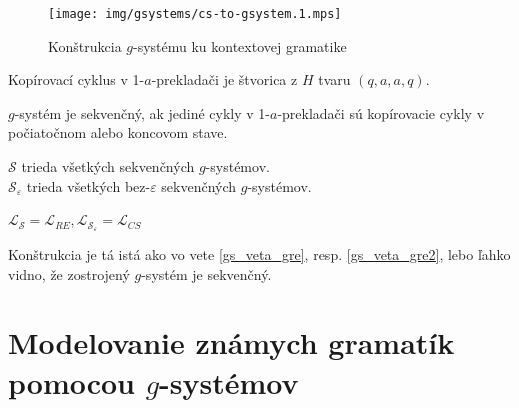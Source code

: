 \begin{figure}
    \centering
    \texttt{[image: img/gsystems/cs-to-gsystem.1.mps]}
    \caption{Konštrukcia $g$-systému ku kontextovej gramatike}
    \label{fig:cs-to-gsystem}
\end{figure}

\begin{definicia}
Kopírovací cyklus v 1-$a$-prekladači je štvorica z $H$ tvaru
$(q,a,a,q)$.
\end{definicia}

\begin{definicia}
$g$-systém je sekvenčný, ak jediné cykly v 1-$a$-prekladači sú
kopírovacie cykly v počiatočnom alebo koncovom stave.
\end{definicia}

\begin{oznacenie}
$\mathcal{S}$ trieda všetkých sekvenčných $g$-systémov.\\
$\mathcal{S}_\varepsilon$ trieda všetkých bez-$\varepsilon$
sekvenčných $g$-systémov.
\end{oznacenie}

\pagebreak

\begin{veta}\label{gs_veta_gsek}
$\mathcal{L}_{\mathcal{S}}=\mathcal{L}_{RE},
\mathcal{L}_{\mathcal{S}_\varepsilon}=\mathcal{L}_{CS}$
\end{veta}

\begin{dokaz}
Konštrukcia je tá istá ako vo vete \ref{gs_veta_gre}, resp.
\ref{gs_veta_gre2}, lebo ľahko vidno, že zostrojený $g$-systém je
sekvenčný.
\end{dokaz}

\section{Modelovanie známych gramatík pomocou $g$-systémov}

